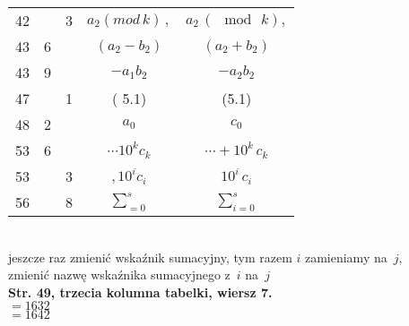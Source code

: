\documentclass[a4paper,11pt]{article}
\begin{document}
\begin{center}
\begin{tabular}{|c|c|c|c|c|}
    42  & &  3 & $a_{ 2 } ( mod \, k ) \, ,$ & $a_{ 2 } \, ( \mod \, k ),$ \\
    43  &  6 & & $( a_{ 2 } - b_{ 2 } )$ & $( a_{ 2 } + b_{ 2 } )$ \\
    43  &  9 & & $- a_{ 1 } b_{ 2 }$ & $- a_{ 2 } b_{ 2 }$ \\
    47  & &  1 & ( 5.1) & (5.1) \\
    48  &  2 & & $a_{ 0 }$ & $c_{ 0 }$ \\
    53  &  6 & & $\cdots 10^{ k } c_{ k }$ & $\cdots + 10^{ k } \, c_{ k }$ \\
    53  & &  3 & $, 10^{ i } c_{ i }$ & $10^{ i } \, c_{ i }$ \\
    56  & &  8 & $\displaystyle \sum_{ = 0 }^{ s }$
      & $\displaystyle \sum_{ i = 0 }^{ s }$ \\
    \hline
  \end{tabular}

\end{center}

\vspace{\spaceTwo}


 \\
\Jest  jeszcze raz zmienić wskaźnik sumacyjny, tym razem $i$ zamieniamy
na~$j$, \\
\Powin zmienić nazwę wskaźnika sumacyjnego z~$i$ na~$j$ \\
\textbf{Str. 49, trzecia kolumna tabelki, wiersz 7.} \\
\Jest  $= 1632$ \\
\Powin $= 1642$ \\













{}






\end{document}
